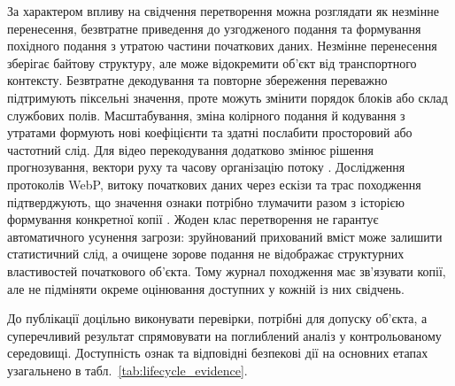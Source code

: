 За характером впливу на свідчення перетворення можна розглядати як незмінне перенесення, безвтратне приведення до узгодженого подання та формування похідного подання з утратою частини початкових даних. Незмінне перенесення зберігає байтову структуру, але може відокремити об’єкт від транспортного контексту. Безвтратне декодування та повторне збереження переважно підтримують піксельні значення, проте можуть змінити порядок блоків або склад службових полів. Масштабування, зміна колірного подання й кодування з утратами формують нові коефіцієнти та здатні послабити просторовий або частотний слід. Для відео перекодування додатково змінює рішення прогнозування, вектори руху та часову організацію потоку \cite{bouzegza2022video}. Дослідження протоколів WebP, витоку початкових даних через ескізи та трас походження підтверджують, що значення ознаки потрібно тлумачити разом з історією формування конкретної копії \cite{koptyra2023webp,benes2023thumbnails,kiltz2024trace}. Жоден клас перетворення не гарантує автоматичного усунення загрози: зруйнований прихований вміст може залишити статистичний слід, а очищене зорове подання не відображає структурних властивостей початкового об’єкта. Тому журнал походження має зв’язувати копії, але не підміняти окреме оцінювання доступних у кожній із них свідчень.

До публікації доцільно виконувати перевірки, потрібні для допуску об’єкта, а суперечливий результат спрямовувати на поглиблений аналіз у контрольованому середовищі. Доступність ознак та відповідні безпекові дії на основних етапах узагальнено в табл.~\ref{tab:lifecycle_evidence}.

